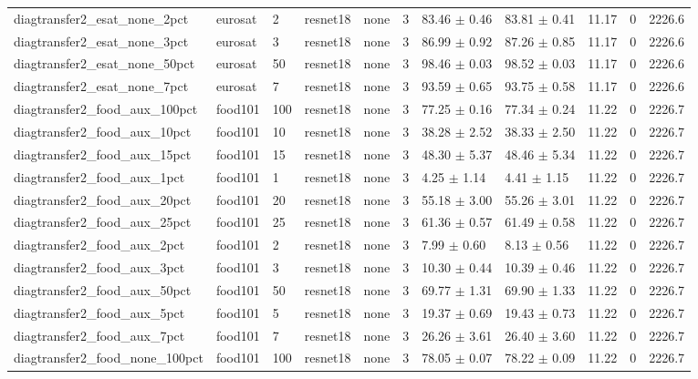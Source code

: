 \begin{tabular}{lllllllllll}
diagtransfer2_esat_none_2pct & eurosat & 2 & resnet18 & none & 3 & 83.46 $\pm$ 0.46 & 83.81 $\pm$ 0.41 & 11.17 & 0 & 2226.6 \\
diagtransfer2_esat_none_3pct & eurosat & 3 & resnet18 & none & 3 & 86.99 $\pm$ 0.92 & 87.26 $\pm$ 0.85 & 11.17 & 0 & 2226.6 \\
diagtransfer2_esat_none_50pct & eurosat & 50 & resnet18 & none & 3 & 98.46 $\pm$ 0.03 & 98.52 $\pm$ 0.03 & 11.17 & 0 & 2226.6 \\
diagtransfer2_esat_none_7pct & eurosat & 7 & resnet18 & none & 3 & 93.59 $\pm$ 0.65 & 93.75 $\pm$ 0.58 & 11.17 & 0 & 2226.6 \\
diagtransfer2_food_aux_100pct & food101 & 100 & resnet18 & none & 3 & 77.25 $\pm$ 0.16 & 77.34 $\pm$ 0.24 & 11.22 & 0 & 2226.7 \\
diagtransfer2_food_aux_10pct & food101 & 10 & resnet18 & none & 3 & 38.28 $\pm$ 2.52 & 38.33 $\pm$ 2.50 & 11.22 & 0 & 2226.7 \\
diagtransfer2_food_aux_15pct & food101 & 15 & resnet18 & none & 3 & 48.30 $\pm$ 5.37 & 48.46 $\pm$ 5.34 & 11.22 & 0 & 2226.7 \\
diagtransfer2_food_aux_1pct & food101 & 1 & resnet18 & none & 3 & 4.25 $\pm$ 1.14 & 4.41 $\pm$ 1.15 & 11.22 & 0 & 2226.7 \\
diagtransfer2_food_aux_20pct & food101 & 20 & resnet18 & none & 3 & 55.18 $\pm$ 3.00 & 55.26 $\pm$ 3.01 & 11.22 & 0 & 2226.7 \\
diagtransfer2_food_aux_25pct & food101 & 25 & resnet18 & none & 3 & 61.36 $\pm$ 0.57 & 61.49 $\pm$ 0.58 & 11.22 & 0 & 2226.7 \\
diagtransfer2_food_aux_2pct & food101 & 2 & resnet18 & none & 3 & 7.99 $\pm$ 0.60 & 8.13 $\pm$ 0.56 & 11.22 & 0 & 2226.7 \\
diagtransfer2_food_aux_3pct & food101 & 3 & resnet18 & none & 3 & 10.30 $\pm$ 0.44 & 10.39 $\pm$ 0.46 & 11.22 & 0 & 2226.7 \\
diagtransfer2_food_aux_50pct & food101 & 50 & resnet18 & none & 3 & 69.77 $\pm$ 1.31 & 69.90 $\pm$ 1.33 & 11.22 & 0 & 2226.7 \\
diagtransfer2_food_aux_5pct & food101 & 5 & resnet18 & none & 3 & 19.37 $\pm$ 0.69 & 19.43 $\pm$ 0.73 & 11.22 & 0 & 2226.7 \\
diagtransfer2_food_aux_7pct & food101 & 7 & resnet18 & none & 3 & 26.26 $\pm$ 3.61 & 26.40 $\pm$ 3.60 & 11.22 & 0 & 2226.7 \\
diagtransfer2_food_none_100pct & food101 & 100 & resnet18 & none & 3 & 78.05 $\pm$ 0.07 & 78.22 $\pm$ 0.09 & 11.22 & 0 & 2226.7 \\

\end{tabular}
